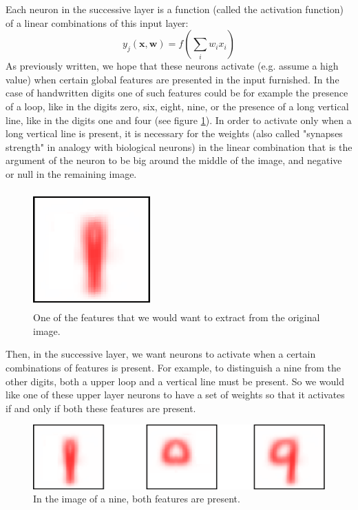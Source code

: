 \documentclass[a4paper]{report}
\begin{document}
Each neuron in the successive layer is a function (called the activation function) of a linear combinations of this input layer:
\begin{equation}
y_j(\textbf{x}, \textbf{w}) = f (\sum_i w_i x_i)
\end{equation}
As previously written, we hope that these neurons activate (e.g.
assume a high value) when certain global features are presented in the input furnished.
In the case of handwritten digits one of such features could be for example the presence of a loop, like in the digits zero, six, eight, nine, or the presence of a long vertical line, like in the digits one and four (see figure \ref{feat}).
In order to activate only when a long vertical line is present, it is necessary for the weights (also called "synapses strength" in analogy with biological neurons) in the linear combination that is the argument of the neuron to be big around the middle of the image, and negative or null in the remaining image.
\begin{figure} [H]
\centering
\includegraphics [height=4.5cm ,width=4.5cm ] {o/nine.png}
\caption{One of the features that we would want to extract from the original image.}
\label{feat}
\end{figure}
Then, in the successive layer, we want neurons to activate when a certain combinations of features is present.
For example, to distinguish a nine from the other digits, both a upper loop and a vertical line must be present.
So we would like one of these upper layer neurons to have a set of weights so that it activates if and only if both these features are present.

\begin{figure} [H]
\centering
\includegraphics [width=\textwidth] {o/features.png}
\caption{In the image of a nine, both features are present.}
\end{figure}
\end{document}
